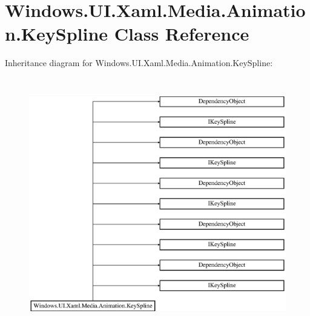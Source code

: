 \hypertarget{class_windows_1_1_u_i_1_1_xaml_1_1_media_1_1_animation_1_1_key_spline}{}\section{Windows.\+U\+I.\+Xaml.\+Media.\+Animation.\+Key\+Spline Class Reference}
\label{class_windows_1_1_u_i_1_1_xaml_1_1_media_1_1_animation_1_1_key_spline}
Inheritance diagram for Windows.\+U\+I.\+Xaml.\+Media.\+Animation.\+Key\+Spline\+:\begin{figure}[H]
\begin{center}
\leavevmode
\includegraphics[height=11.000000cm]{class_windows_1_1_u_i_1_1_xaml_1_1_media_1_1_animation_1_1_key_spline}
\end{center}
\end{figure}
